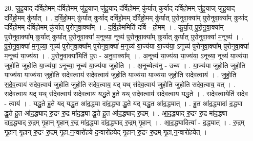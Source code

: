 \documentclass[17pt]{extarticle}
\begin{document}
20. जु॒हु॒याद् द॑र्विहो॒मम् द॑र्विहो॒मम् जु॑हु॒याज् जु॑हु॒याद् द॑र्विहो॒मम् कु॑र्यात् कुर्याद् दर्विहो॒मम् जु॑हु॒याज् जु॑हु॒याद् द॑र्विहो॒मम् कु॑र्यात् । . द॒र्वि॒हो॒मम् कु॑र्यात् कुर्याद् दर्विहो॒मम् द॑र्विहो॒मम् कु॑र्यात् पुरोनुवा॒क्या᳚म् पुरोनुवा॒क्या᳚म् कुर्याद् दर्विहो॒मम् द॑र्विहो॒मम् कु॑र्यात् पुरोनुवा॒क्या᳚म् । . द॒र्वि॒हो॒ममिति॑ दर्वि - हो॒मम् । . कु॒र्या॒त् पु॒रो॒नु॒वा॒क्या᳚म् पुरोनुवा॒क्या᳚म् कुर्यात् कुर्यात् पुरोनुवा॒क्या॑ म॒नूच्या॒ नूच्य॑ पुरोनुवा॒क्या᳚म् कुर्यात् कुर्यात् पुरोनुवा॒क्या॑ म॒नूच्य॑ । . पु॒रो॒नु॒वा॒क्या॑ म॒नूच्या॒ नूच्य॑ पुरोनुवा॒क्या᳚म् पुरोनुवा॒क्या॑ म॒नूच्य॑ या॒ज्य॑या या॒ज्य॑या॒ ऽनूच्य॑ 
पुरोनुवा॒क्या᳚म् पुरोनुवा॒क्या॑ म॒नूच्य॑ या॒ज्य॑या । . पु॒रो॒नु॒वा॒क्या॑मिति॑ पुरः - अ॒नु॒वा॒क्या᳚म् । . अ॒नूच्य॑ या॒ज्य॑या या॒ज्य॑या॒ ऽनूच्या॒ नूच्य॑ या॒ज्य॑या जुहोति जुहोति या॒ज्य॑या॒ ऽनूच्या॒ नूच्य॑ या॒ज्य॑या जुहोति । . अ॒नूच्येत्य॑नु - उच्य॑ । . या॒ज्य॑या जुहोति जुहोति या॒ज्य॑या या॒ज्य॑या जुहोति सदेव॒त्वाय॑ सदेव॒त्वाय॑ जुहोति या॒ज्य॑या या॒ज्य॑या जुहोति सदेव॒त्वाय॑ । . जु॒हो॒ति॒ स॒दे॒व॒त्वाय॑ सदेव॒त्वाय॑ जुहोति जुहोति सदेव॒त्वाय॒ यद् यथ् स॑देव॒त्वाय॑ जुहोति जुहोति सदेव॒त्वाय॒ यत् । . स॒दे॒व॒त्वाय॒ यद् यथ् स॑देव॒त्वाय॑ सदेव॒त्वाय॒ यद्धु॒ते हु॒ते यथ् स॑देव॒त्वाय॑ सदेव॒त्वाय॒ यद्धु॒ते । . स॒दे॒व॒त्वायेति॑ सदेव - त्वाय॑ । . यद्धु॒ते हु॒ते यद् यद्धु॒त आ॑द॒द्ध्या दा॑द॒द्ध्या द्धु॒ते यद् यद्धु॒त आ॑द॒द्ध्यात् । . हु॒त आ॑द॒द्ध्यादा॑ द॒द्ध्या द्धु॒ते हु॒त आ॑द॒द्ध्याद् रु॒द्रꣳ रु॒द्र मा॑द॒द्ध्या द्धु॒ते हु॒त आ॑द॒द्ध्याद् रु॒द्रम् । . आ॒द॒द्ध्याद् रु॒द्रꣳ रु॒द्र मा॑द॒द्ध्या दा॑द॒द्ध्याद् रु॒द्रम् गृ॒हान् गृ॒हान् रु॒द्र मा॑द॒द्ध्या दा॑द॒द्ध्याद् रु॒द्रम् गृ॒हान् । . आ॒द॒द्ध्यादित्या᳚ - द॒द्ध्यात् । . रु॒द्रम् गृ॒हान् गृ॒हान् रु॒द्रꣳ रु॒द्रम् गृ॒हा,न॒न्वारो॑हये द॒न्वारो॑हयेद् गृ॒हान् रु॒द्रꣳ रु॒द्रम् गृ॒हा,न॒न्वारो॑हयेत् । \newline
\end{document}
